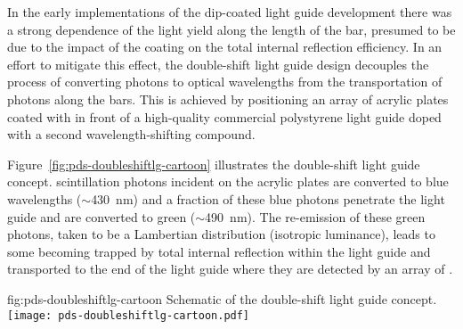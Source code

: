 In the early implementations of the dip-coated light guide development there was a strong dependence of the light yield along the length of the bar, presumed to be due to the impact of the coating on the total internal reflection efficiency.  In an effort to mitigate this effect, the double-shift light guide design decouples the process of converting  photons to optical
wavelengths from the transportation of photons along the bars. This is achieved by positioning an array of acrylic plates coated with  in front of a high-quality commercial polystyrene light guide doped with a second wavelength-shifting compound.


Figure~\ref{fig:pds-doubleshiftlg-cartoon} illustrates the double-shift light guide concept.  scintillation photons incident on the acrylic plates are converted to blue wavelengths ($\sim$\SI{430}{nm}) and a fraction of these blue photons penetrate the light guide and are converted to green ($\sim$\SI{490}{nm}). The re-emission of these green photons, taken to be a Lambertian distribution (isotropic luminance), leads to some becoming trapped by total internal reflection within the light guide and  transported to the end of the light guide where they are detected by an array of .

\begin{dunefigure}{fig:pds-doubleshiftlg-cartoon}
{Schematic of the double-shift light guide concept.}
  \texttt{[image: pds-doubleshiftlg-cartoon.pdf]}
\end{dunefigure}


%


